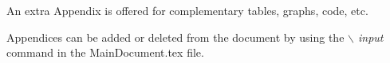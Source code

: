 An extra Appendix is offered for complementary tables, graphs, code, etc. 

Appendices can be added or deleted from the document by using the \textit{$\backslash$ input} command in the MainDocument.tex file.